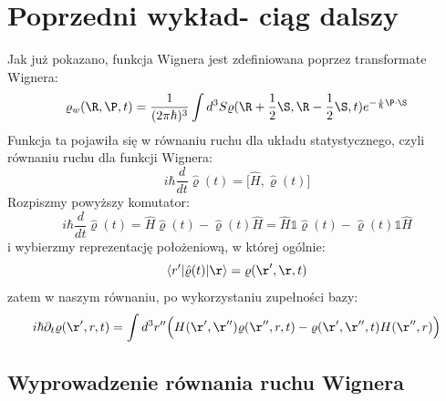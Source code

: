 
\section{Poprzedni wykład- ciąg dalszy}
Jak już pokazano, funkcja Wignera jest zdefiniowana poprzez transformate Wignera:
\begin{equation}\varrho_w(\R,\P,t)=\frac{1}{(2\pi\hbar)^3}
\int d^3S\varrho(\R+\frac{1}{2}\S,\R-\frac{1}{2}\S,t)e^{-\frac{i}{\hbar}\P\cdot\S}
\end{equation}
Funkcja ta pojawiła się w równaniu ruchu dla układu statystycznego, czyli równaniu ruchu dla funkcji Wignera:
\begin{equation}i\hbar\frac{d}{dt}\hat{\varrho}(t)=\Big[\hat{H},\hat{\varrho}(t)\Big]
\end{equation}
Rozpiszmy powyższy komutator:
\begin{equation}i\hbar\frac{d}{dt}\hat{\varrho}(t)=\hat{H}\hat{\varrho}(t)-\hat{\varrho}(t)\hat{H}=\hat{H}\mathds{1}\hat{\varrho}(t)-\hat{\varrho}(t)\mathds{1}\hat{H}
\end{equation}
i wybierzmy reprezentację położeniową, w której ogólnie:
\begin{equation}
\langle r'|\hat{\varrho}(t)|\r\rangle=\varrho(\r',\r,t)
\end{equation}
zatem w naszym równaniu, po wykorzystaniu zupełności bazy:
\begin{equation}i\hbar\partial_t\varrho(\r',r,t)=
\int d^3r''\Big(H(\r',\r'')\varrho(\r'',r,t)-
\varrho(\r',\r'',t)H(\r'',r)\Big)
\end{equation}
\subsection{Wyprowadzenie równania ruchu Wignera}
